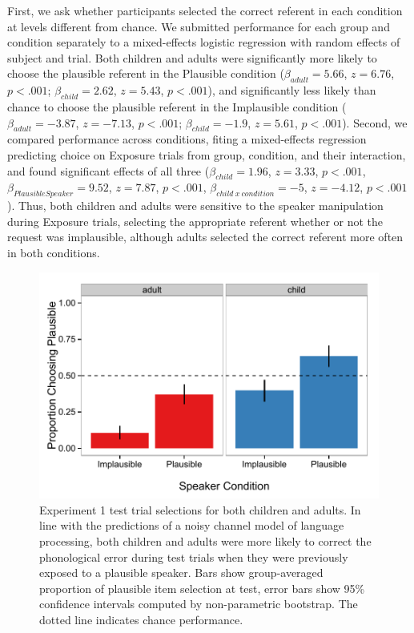 \documentclass[man,floatsintext]{apa6}
\begin{document}
First, we ask whether participants selected the correct referent in each condition at levels different from chance. We submitted performance for each group and condition separately to a mixed-effects logistic regression with random effects of subject and trial. Both children and adults were significantly more likely to choose the plausible referent in the Plausible condition ($\beta_{adult} = 5.66$, $z = 6.76$, $p <.001$; $\beta_{child} = 2.62$, $z = 5.43$, $p <.001$), and significantly less likely than chance to choose the plausible referent in the Implausible condition ($\beta_{adult} = -3.87$, $z = -7.13$, $p <.001$; $\beta_{child} = -1.9$, $z = 5.61$, $p <.001$). Second, we compared performance across conditions, fiting a mixed-effects regression predicting choice on Exposure trials from group, condition, and their interaction, and found significant effects of all three ($\beta_{child} = 1.96$,  $z = 3.33$, $p <.001$, $\beta_{Plausible Speaker} = 9.52$,  $z = 7.87$, $p <.001$,  $\beta_{child\: x \: condition} = -5$,  $z = -4.12$, $p <.001$). Thus, both children and adults were sensitive to the speaker manipulation during Exposure trials, selecting the appropriate referent whether or not the request was implausible, although adults selected the correct referent more often in both conditions.

\begin{figure}[t]
     \begin{center}
     \includegraphics[width=\textwidth]{figures/exp1_results.pdf}
    \end{center}
    \caption{Experiment 1 test trial selections for both children and adults. In line with the predictions of a noisy channel model of language processing, both children and adults were more likely to correct the phonological error during test trials when they were previously exposed to a plausible speaker. Bars show group-averaged proportion of plausible item selection at test, error bars show 95\% confidence intervals computed by non-parametric bootstrap. The dotted line indicates chance performance.}%
   \label{fig:exp1_results}
\end{figure}
\end{document}

